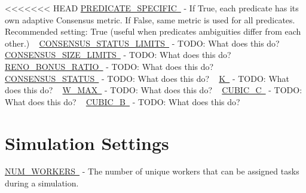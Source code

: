 <<<<<<< HEAD
\mbox{\hyperlink{namespacedynamicfilterapp_1_1toggles_a2826a54e707f46fbd0fa2f8f6219ead7}{P\+R\+E\+D\+I\+C\+A\+T\+E\+\_\+\+S\+P\+E\+C\+I\+F\+IC }} -\/ If True, each predicate has its own adaptive Consensus metric. If False, same metric is used for all predicates. Recommended setting\+: True (useful when predicates\textquotesingle{} ambiguities differ from each other.) ~\newline
 \mbox{\hyperlink{namespacedynamicfilterapp_1_1toggles_a36cac18f3d673a6f2cd86c88127e41b9}{C\+O\+N\+S\+E\+N\+S\+U\+S\+\_\+\+S\+T\+A\+T\+U\+S\+\_\+\+L\+I\+M\+I\+TS }} -\/ T\+O\+DO\+: What does this do? ~\newline
 \mbox{\hyperlink{namespacedynamicfilterapp_1_1toggles_a1a20e4a8af9569eaef5eb5b23f07222b}{C\+O\+N\+S\+E\+N\+S\+U\+S\+\_\+\+S\+I\+Z\+E\+\_\+\+L\+I\+M\+I\+TS }} -\/ T\+O\+DO\+: What does this do? ~\newline
 \mbox{\hyperlink{namespacedynamicfilterapp_1_1toggles_a18fd240c30a7c4a6ee9df12436a744ab}{R\+E\+N\+O\+\_\+\+B\+O\+N\+U\+S\+\_\+\+R\+A\+T\+IO }} -\/ T\+O\+DO\+: What does this do? ~\newline
 \mbox{\hyperlink{namespacedynamicfilterapp_1_1toggles_a090eab76b7b0e234f422b87e30adf793}{C\+O\+N\+S\+E\+N\+S\+U\+S\+\_\+\+S\+T\+A\+T\+US }} -\/ T\+O\+DO\+: What does this do? ~\newline
 \mbox{\hyperlink{namespacedynamicfilterapp_1_1toggles_a2689c4b3931025b79053532a5f1b0a85}{K }} -\/ T\+O\+DO\+: What does this do? ~\newline
 \mbox{\hyperlink{namespacedynamicfilterapp_1_1toggles_add63171ca968cbd5ca4d60dfbf9a2746}{W\+\_\+\+M\+AX }} -\/ T\+O\+DO\+: What does this do? ~\newline
 \mbox{\hyperlink{namespacedynamicfilterapp_1_1toggles_a073a7aa1bc6b8c92d5682922759765fd}{C\+U\+B\+I\+C\+\_\+C }} -\/ T\+O\+DO\+: What does this do? ~\newline
 \mbox{\hyperlink{namespacedynamicfilterapp_1_1toggles_a2d4f2e30d34616c754114da7b5c88000}{C\+U\+B\+I\+C\+\_\+B }} -\/ T\+O\+DO\+: What does this do? ~\newline
 \hypertarget{toggles_sim}{}\section{Simulation Settings}\label{toggles_sim}
\mbox{\hyperlink{namespacedynamicfilterapp_1_1toggles_a806fc12166c09fa5baabfcbe218040ae}{N\+U\+M\+\_\+\+W\+O\+R\+K\+E\+RS }} -\/ The number of unique workers that can be assigned tasks during a simulation. ~\newline
